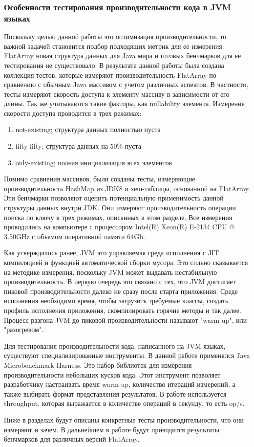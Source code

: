 \subsubsection{Особенности тестирования производительности кода в JVM языках}
Поскольку целью данной работы это оптимизация производительности, то важной задачей становится подбор подходящих метрик для ее измерения. FlatArray новая структура данных для Java мира и готовых бенчмарков для ее тестирования не существовало. 
В результате данной работы была создана коллекция тестов, которые измеряют производительность FlatArray по сравнению с обычным Java массивом с учетом различных аспектов.
В частности, тесты измеряют скорость доступа к элементу массиву в зависимости от его длины. Так же учитываются такие факторы, как nullability элемента. Измерение скорости доступа проводится в трех режимах:
\begin{enumerate}
	\item not-existing; структура данных полностью пуста
	\item fifty-fifty; структура данных на 50\% пуста
	\item only-existing; полная инициализация всех элементов
\end{enumerate}
Помимо сравнения массивов, были созданы тесты, измеряющие производительность HashMap из JDK8 и хеш-таблицы, основанной на FlatArray. Эти бенчмарки позволяют оценить потенциальную применимость данной структуры данных внутри JDK. Они измеряют производительность операции поиска по ключу в трех режимах, описанных в этом разделе.
Все измерения проводились на компьютере с процессором Intel(R) Xeon(R) E-2134 CPU @ 3.50GHz
с объемом оперативной памяти 64Gb.
\par
Как утверждалось ранее, JVM это управляемая среда исполнения с JIT компиляцией и функцией автоматической сборки мусора. Это сильно сказывается на методике измерения, поскольку JVM может выдавать нестабильную производительность. 
В первую очередь это связано с тех, что JVM достигает пиковой производительности далеко не сразу после старта приложения.
Среде исполнения необходимо время, чтобы загрузить требуемые классы, создать профиль исполнения приложения, скомпилировать горячие методы и так далее.
Процесс разгона JVM до пиковой производительности называют "warm-up", или "разогревом".
\par
Для тестирования производительности кода, написанного на JVM языках, существуют специализированные инструменты. 
В данной работе применялся Java Microbenchmark Harness\cite{jmh}. Это набор библиотек для измерения производительности небольших кусков кода.
Этот инструмент позволяет разработчику настраивать время warm-up, количество итераций измерений, а также выбирать формат представления результатов. 
В работе используется throughput, которая выражается в количестве операций в секунду, то есть op/s. 
\par
Ниже в разделах будут описаны конкретные тесты производительности, что они измеряют и зачем. В дальнейшем в работе будут приводится результаты бенчмарков для различных версий FlatArray.

